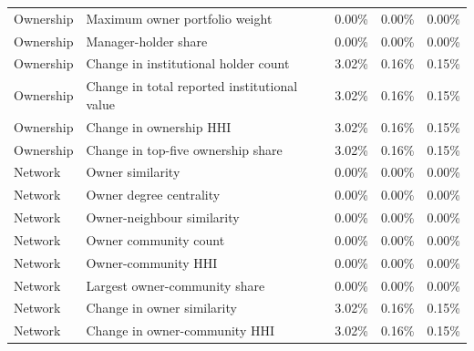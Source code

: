 \begin{longtable}{p{}p{}rrr}
        Ownership & Maximum owner portfolio weight & 0.00\% & 0.00\% & 0.00\% \\
        Ownership & Manager-holder share & 0.00\% & 0.00\% & 0.00\% \\
        Ownership & Change in institutional holder count & 3.02\% & 0.16\% & 0.15\% \\
        Ownership & Change in total reported institutional value & 3.02\% & 0.16\% & 0.15\% \\
        Ownership & Change in ownership HHI & 3.02\% & 0.16\% & 0.15\% \\
        Ownership & Change in top-five ownership share & 3.02\% & 0.16\% & 0.15\% \\
        Network & Owner similarity & 0.00\% & 0.00\% & 0.00\% \\
        Network & Owner degree centrality & 0.00\% & 0.00\% & 0.00\% \\
        Network & Owner-neighbour similarity & 0.00\% & 0.00\% & 0.00\% \\
        Network & Owner community count & 0.00\% & 0.00\% & 0.00\% \\
        Network & Owner-community HHI & 0.00\% & 0.00\% & 0.00\% \\
        Network & Largest owner-community share & 0.00\% & 0.00\% & 0.00\% \\
        Network & Change in owner similarity & 3.02\% & 0.16\% & 0.15\% \\
        Network & Change in owner-community HHI & 3.02\% & 0.16\% & 0.15\% \\
\end{longtable}
\endgroup
